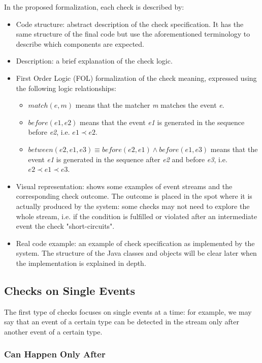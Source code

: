 \documentclass[11pt,a4paper,notitlepage]{article}
\begin{document}
In the proposed formalization, each check is described by:
\begin{itemize}
	\item Code structure: abstract description of the check specification. It has the same structure of the final code but use the aforementioned terminology to describe which components are expected.
	\item Description: a brief explanation of the check logic.
	\item First Order Logic (FOL) formalization of the check meaning, expressed using the following logic relationships:
	\begin{itemize}
		\item $match(e, m)$ means that the matcher \textit{m} matches the event \textit{e}.
		\item $before(e1, e2)$ means that the event \textit{e1} is generated in the sequence before \textit{e2}, i.e. $e1 \prec e2$.
		\item $between(e2, e1, e3) \equiv before(e2, e1) \land before(e1, e3)$ means that the event \textit{e1} is generated in the sequence after \textit{e2} and before \textit{e3}, i.e. $e2 \prec e1 \prec e3$.
	\end{itemize}
	\item Visual representation: shows some examples of event streams and the corresponding check outcome. The outcome is placed in the spot where it is actually produced by the system: some checks may not need to explore the whole stream, i.e. if the condition is fulfilled or violated after an intermediate event the check "short-circuits".
	\item Real code example: an example of check specification as implemented by the system. The structure of the Java classes and objects will be clear later when the implementation is explained in depth.
\end{itemize}

\clearpage %

\subsection{Checks on Single Events}

The first type of checks focuses on single events at a time: for example, we may say that an event of a certain type can be detected in the stream only after another event of a certain type.

\subsubsection{Can Happen Only After}
\end{document}
